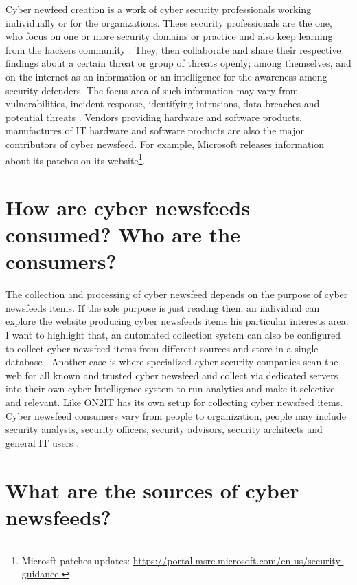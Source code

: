 Cyber newfeed creation is a work of cyber security professionals working individually or for the organizations. 
These security professionals are the one, 
who focus on one or more security domains or practice and also keep learning from the hackers community 
\citep{mahmood2010moving}. 
They, then collaborate and share their respective findings about a certain threat or group of threats openly; 
among themselves, 
and on the internet as an information
or an intelligence for the awareness among security defenders. 
The focus area of such information may vary from vulnerabilities,
incident response, identifying intrusions, 
data breaches and potential threats 
\citep{rantos2020interoperability}. 
Vendors providing hardware and software products, 
manufactures of IT hardware and 
software products are also the major contributors of cyber newsfeed. 
For example, Microsoft releases information about its patches on its website\footnote{Microsft patches updates: \url{https://portal.msrc.microsoft.com/en-us/security-guidance.}}.

\section{How are cyber newsfeeds consumed? Who are the consumers?}

The collection and processing of cyber newsfeed  
depends on the purpose of cyber newsfeeds items. 
If the sole purpose is just reading then, 
an individual can explore the website producing cyber newsfeeds items 
his particular interests area.  
I want to highlight that, 
an automated collection system can also be configured 
to collect cyber newsfeed items from different sources and 
store in a single database 
\citep{sauerwein2017threat}. 
Another case is where specialized cyber security companies scan 
the web for all known and trusted cyber newsfeed and 
collect via dedicated servers into their own cyber Intelligence system 
to run analytics and make it selective and relevant. 
Like ON2IT has its own setup for collecting cyber newsfeed items. 
Cyber newsfeed consumers vary from people to organization, 
people may include security analysts, security officers, 
security advisors, security architects and general IT users 
\citep{shackleford2015s}.

\section{What are the sources of cyber newsfeeds?}

